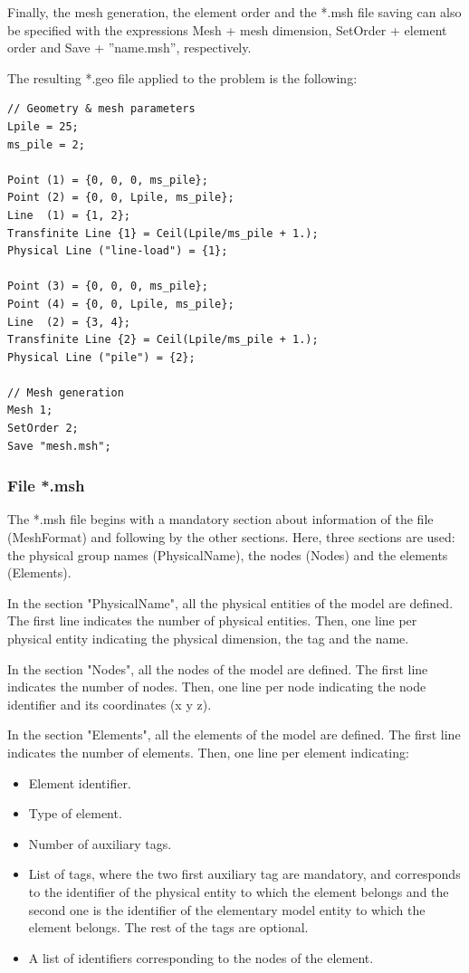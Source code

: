 \documentclass[a4]{article}
\begin{document}
Finally, the mesh generation, the element order and the *.msh file saving can also be specified
with the expressions Mesh + mesh dimension, SetOrder + element order and Save + ”name.msh”,
respectively.

The resulting *.geo file applied to the problem is the following:

\begin{Verbatim}
// Geometry & mesh parameters
Lpile = 25;
ms_pile = 2;

Point (1) = {0, 0, 0, ms_pile};
Point (2) = {0, 0, Lpile, ms_pile};
Line  (1) = {1, 2};
Transfinite Line {1} = Ceil(Lpile/ms_pile + 1.);
Physical Line ("line-load") = {1};

Point (3) = {0, 0, 0, ms_pile};
Point (4) = {0, 0, Lpile, ms_pile};
Line  (2) = {3, 4};
Transfinite Line {2} = Ceil(Lpile/ms_pile + 1.);
Physical Line ("pile") = {2};

// Mesh generation
Mesh 1;
SetOrder 2;
Save "mesh.msh";
\end{Verbatim}

\subsubsection{File *.msh}

The *.msh file begins with a mandatory section about information of the file (MeshFormat) and following by the other sections. Here, three sections are used: the physical group names (PhysicalName), the nodes (Nodes) and the elements (Elements).

In the section "PhysicalName", all the physical entities of the model are defined. The first line indicates the number of physical entities. Then, one line per physical entity indicating the physical dimension, the tag and the name.  

In the section "Nodes", all the nodes of the model are defined. The first line indicates the number of nodes. Then, one line per node indicating the node identifier and its coordinates (x y z).

In the section "Elements", all the elements of the model are defined. The first line indicates the number of elements. Then, one line per element indicating:

\begin{itemize}
	\item Element identifier.
	\item Type of element.
	\item Number of auxiliary tags.
	\item List of tags, where the two first auxiliary tag are mandatory, and corresponds to the identifier of the physical entity to which the element belongs and the second one is the identifier of the elementary model entity to which the element belongs. The rest of the tags are optional.
	\item A list of identifiers corresponding to the nodes of the element.
\end{itemize}
\end{document}

